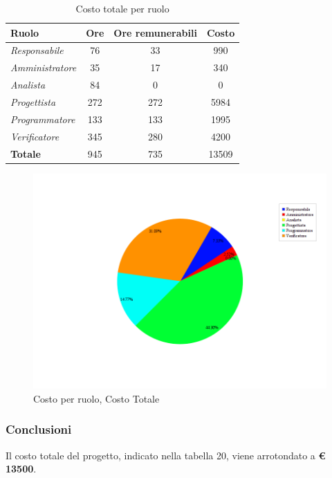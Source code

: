 \begin{table}[H]
	\begin{center}
		\begin{tabular}{|l|c|c|c|}
			\hline
			\textbf{Ruolo}	& \textbf{Ore} &	\textbf{Ore remunerabili}	 &\textbf{Costo} \\
			\hline
			\textit{Responsabile}	&	76	&	33	&	990	\\
			\hline
			\textit{Amministratore}	&	35	&	17	&	340	\\
			\hline
			\textit{Analista}	&	84	&	0	&	0	\\
			\hline
			\textit{Progettista}		&	272	&	272	&	5984	\\
			\hline
			\textit{Programmatore}	&	133	&	133	&	1995	\\
			\hline
			\textit{Verificatore}	&	345	&	280	&	4200	\\
			\hline
			\textbf{Totale}	&	945	&	735	&	13509	\\
			\hline
		\end{tabular}
	\end{center}
	\caption{Costo totale per ruolo}
\end{table}

\begin{figure}[H]
	\centering
	\includegraphics[scale=0.4]{immagini/Grafi/CostoTot}
	\caption{Costo per ruolo, Costo Totale}
\end{figure}

\subsubsection{Conclusioni}
Il costo totale del progetto, indicato nella tabella 20, viene arrotondato a \textbf{€ 13500}.\\

